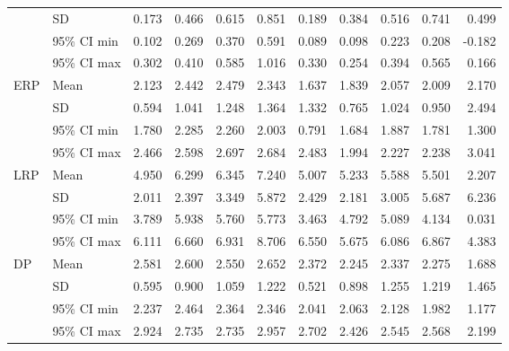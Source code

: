 \begin{longtable}{llrrrrrrrrr}
   & SD &      0.173 &      0.466 &      0.615 &      0.851 &      0.189 &      0.384 &      0.516 &      0.741 &      0.499 \\
   & 95\% CI min &      0.102 &      0.269 &      0.370 &      0.591 &      0.089 &      0.098 &      0.223 &      0.208 &     -0.182 \\
   & 95\% CI max &      0.302 &      0.410 &      0.585 &      1.016 &      0.330 &      0.254 &      0.394 &      0.565 &      0.166 \\
\cline{1-11}
\multirow{4}{*}{ERP} & Mean &      2.123 &      2.442 &      2.479 &      2.343 &      1.637 &      1.839 &      2.057 &      2.009 &      2.170 \\
   & SD &      0.594 &      1.041 &      1.248 &      1.364 &      1.332 &      0.765 &      1.024 &      0.950 &      2.494 \\
   & 95\% CI min &      1.780 &      2.285 &      2.260 &      2.003 &      0.791 &      1.684 &      1.887 &      1.781 &      1.300 \\
   & 95\% CI max &      2.466 &      2.598 &      2.697 &      2.684 &      2.483 &      1.994 &      2.227 &      2.238 &      3.041 \\
\cline{1-11}
\multirow{4}{*}{LRP} & Mean &      4.950 &      6.299 &      6.345 &      7.240 &      5.007 &      5.233 &      5.588 &      5.501 &      2.207 \\
   & SD &      2.011 &      2.397 &      3.349 &      5.872 &      2.429 &      2.181 &      3.005 &      5.687 &      6.236 \\
   & 95\% CI min &      3.789 &      5.938 &      5.760 &      5.773 &      3.463 &      4.792 &      5.089 &      4.134 &      0.031 \\
   & 95\% CI max &      6.111 &      6.660 &      6.931 &      8.706 &      6.550 &      5.675 &      6.086 &      6.867 &      4.383 \\
\cline{1-11}
\multirow{4}{*}{DP} & Mean &      2.581 &      2.600 &      2.550 &      2.652 &      2.372 &      2.245 &      2.337 &      2.275 &      1.688 \\
   & SD &      0.595 &      0.900 &      1.059 &      1.222 &      0.521 &      0.898 &      1.255 &      1.219 &      1.465 \\
   & 95\% CI min &      2.237 &      2.464 &      2.364 &      2.346 &      2.041 &      2.063 &      2.128 &      1.982 &      1.177 \\
   & 95\% CI max &      2.924 &      2.735 &      2.735 &      2.957 &      2.702 &      2.426 &      2.545 &      2.568 &      2.199 \\
\end{longtable}
